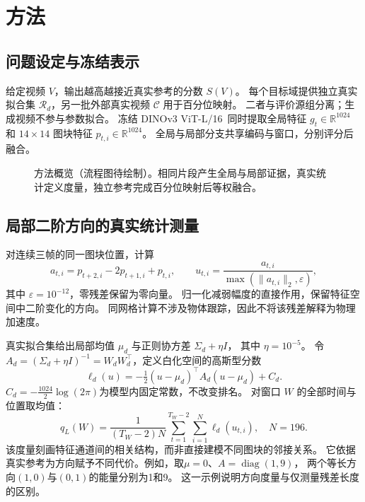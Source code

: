 \section{方法}
\label{sec:method}

\subsection{问题设定与冻结表示}
给定视频 $V$，输出越高越接近真实参考的分数 $S(V)$。
每个目标域提供独立真实拟合集 $\mathcal R_d$，另一批外部真实视频 $\mathcal C$ 用于百分位映射。
二者与评价源组分离；生成视频不参与参数拟合。
冻结 DINOv3 ViT-L/16~\cite{simeoni2025dinov3}同时提取全局特征 $g_t\in\mathbb R^{1024}$
和 $14\times14$ 图块特征 $p_{t,i}\in\mathbb R^{1024}$。
全局与局部分支共享编码与窗口，分别评分后融合。

\begin{figure}[t]
  \centering
  \fbox{\rule{0pt}{25mm}\rule{0.95\columnwidth}{0pt}}
  \caption{\method 方法概览（流程图待绘制）。相同片段产生全局与局部证据，真实统计定义度量，独立参考完成百分位映射后等权融合。}
  \label{fig:pipeline}
\end{figure}

\subsection{局部二阶方向的真实统计测量}
对连续三帧的同一图块位置，计算
\begin{equation}
 a_{t,i}=p_{t+2,i}-2p_{t+1,i}+p_{t,i},\qquad
 u_{t,i}=\frac{a_{t,i}}{\max(\|a_{t,i}\|_2,\varepsilon)},
 \label{eq:local_d2}
\end{equation}
其中 $\varepsilon=10^{-12}$，零残差保留为零向量。
归一化减弱幅度的直接作用，保留特征空间中二阶变化的方向。
同网格计算不涉及物体跟踪，因此不将该残差解释为物理加速度。

真实拟合集给出局部均值 $\mu_d$ 与正则协方差 $\Sigma_d+\eta I$，
其中 $\eta=10^{-5}$。
令 $A_d=(\Sigma_d+\eta I)^{-1}=W_dW_d^\top$，定义白化空间的高斯型分数
\begin{equation}
 \ell_d(u)=-\tfrac12(u-\mu_d)^\top A_d(u-\mu_d)+C_d.
 \label{eq:local_metric}
\end{equation}
$C_d=-\tfrac{1024}{2}\log(2\pi)$为模型内固定常数，不改变排名。
对窗口 $W$ 的全部时间与位置取均值：
\begin{equation}
 q_L(W)=\frac{1}{(T_W-2)N}\sum_{t=1}^{T_W-2}\sum_{i=1}^{N}\ell_d(u_{t,i}),
 \quad N=196.
 \label{eq:local_score}
\end{equation}
该度量刻画特征通道间的相关结构，而非直接建模不同图块的邻接关系。
它依据真实参考为方向赋予不同代价。例如，取$\mu=0$、$A=\operatorname{diag}(1,9)$，
两个等长方向$(1,0)$与$(0,1)$的能量分别为1和9。
这一示例说明方向度量与仅测量残差长度的区别。

